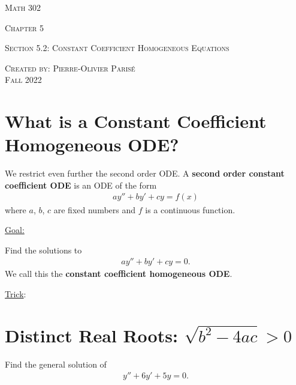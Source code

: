 \documentclass[12pt,a4paper]{article}
\newcounter{example}[section]
\begin{document}
\thispagestyle{empty}

\begin{center}
\vspace*{2.5cm}

{\Huge \textsc{Math 302}}

\vspace*{2cm}

{\LARGE \textsc{Chapter 5}} 

\vspace*{0.75cm}

\noindent\textsc{Section 5.2: Constant Coefficient Homogeneous Equations}

\vspace*{0.75cm}

\tableofcontents

\vfill

\noindent \textsc{Created by: Pierre-Olivier Paris{\'e}} \\
\textsc{Fall 2022}
\end{center}

\newpage

\section{What is a Constant Coefficient Homogeneous ODE?}

We restrict even further the second order ODE. A \textbf{second order constant coefficient ODE} is an ODE of the form
	\begin{align}
	a y'' + by' + c y = f(x) 
	\end{align}
where $a$, $b$, $c$ are fixed numbers and $f$ is a continuous function. 

\underline{Goal:} 

Find the solutions to 
	\begin{align*}
	ay'' + by' + cy = 0 .
	\end{align*}
We call this the \textbf{constant coefficient homogeneous ODE}.

\underline{Trick}:

\newpage

\section{Distinct Real Roots: $\sqrt{b^2 - 4ac} > 0$}

\begin{example}
Find the general solution of
	\begin{align*}
	y'' + 6y' + 5y = 0 .
	\end{align*}
\end{example}
\end{document}
